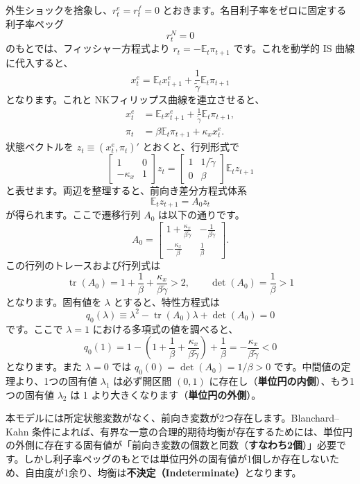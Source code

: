 \documentclass[
  japanese,
  lualatex,
  ja=standard,
  12pt,
  a4paper]{ltjsarticle}
\begin{document}
外生ショックを捨象し、\(r_t^e=r_t^f=0\)
とおきます。名目利子率をゼロに固定する利子率ペッグ \[
r_t^N=0
\] のもとでは、フィッシャー方程式より \(r_t=-\mathbb{E}_t\pi_{t+1}\)
です。これを動学的 IS 曲線に代入すると、 \[
x_t^e
=
\mathbb{E}_t x_{t+1}^e
+\frac{1}{\tilde{\gamma}}\mathbb{E}_t\pi_{t+1}
\] となります。これと NKフィリップス曲線を連立させると、 \[
\begin{aligned}
x_t^e
&=
\mathbb{E}_t x_{t+1}^e
+\frac{1}{\tilde{\gamma}}\mathbb{E}_t\pi_{t+1},\\
\pi_t
&=
\beta\mathbb{E}_t\pi_{t+1}
+\kappa_x x_t^e.
\end{aligned}
\] 状態ベクトルを \(z_t \equiv (x_t^e, \pi_t)'\) とおくと、行列形式で \[
\begin{bmatrix}
1 & 0\\
-\kappa_x & 1
\end{bmatrix}
z_t
=
\begin{bmatrix}
1 & 1/\tilde{\gamma}\\
0 & \beta
\end{bmatrix}
\mathbb{E}_t z_{t+1}
\] と表せます。両辺を整理すると、前向き差分方程式体系 \[
\mathbb{E}_t z_{t+1}=A_0 z_t
\] が得られます。ここで遷移行列 \(A_0\) は以下の通りです。 \[
A_0
=
\begin{bmatrix}
1+\frac{\kappa_x}{\beta\tilde{\gamma}}
&
-\frac{1}{\beta\tilde{\gamma}}\\
-\frac{\kappa_x}{\beta}
&
\frac{1}{\beta}
\end{bmatrix}.
\] この行列のトレースおよび行列式は \[
\operatorname{tr}(A_0)
=
1+\frac{1}{\beta}
+\frac{\kappa_x}{\beta\tilde{\gamma}}>2,
\qquad
\det(A_0)=\frac{1}{\beta}>1
\] となります。固有値を \(\lambda\) とすると、特性方程式は \[
q_0(\lambda)
\equiv
\lambda^2-\operatorname{tr}(A_0)\lambda+\det(A_0)=0
\] です。ここで \(\lambda=1\) における多項式の値を調べると、 \[
q_0(1)
=
1 - \left(1+\frac{1}{\beta}+\frac{\kappa_x}{\beta\tilde{\gamma}}\right) + \frac{1}{\beta}
=
-\frac{\kappa_x}{\beta\tilde{\gamma}}<0
\] となります。また \(\lambda=0\) では
\(q_0(0) = \det(A_0) = 1/\beta > 0\) です。中間値の定理より、1つの固有値
\(\lambda_1\) は必ず開区間 \((0, 1)\)
に存在し（\textbf{単位円の内側}）、もう1つの固有値 \(\lambda_2\) は 1
より大きくなります（\textbf{単位円の外側}）。

本モデルには所定状態変数がなく、前向き変数が2つ存在します。Blanchard--Kahn
条件によれば、有界な一意の合理的期待均衡が存在するためには、単位円の外側に存在する固有値が「前向き変数の個数と同数（\textbf{すなわち2個}）」必要です。しかし利子率ペッグのもとでは単位円外の固有値が1個しか存在しないため、自由度が1余り、均衡は\textbf{不決定（Indeterminate）}となります。
\end{document}
